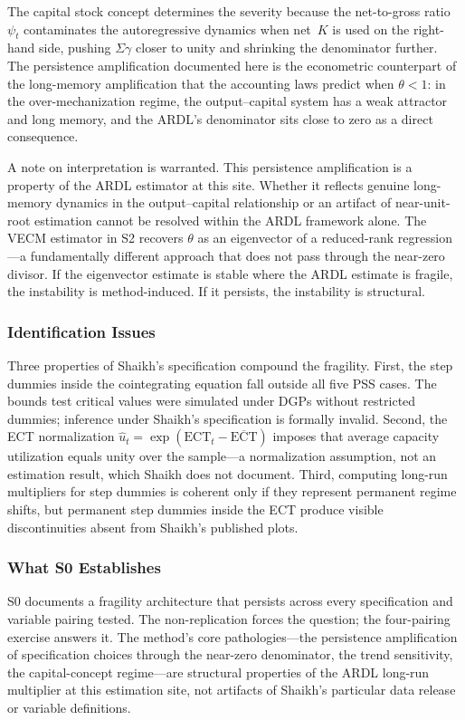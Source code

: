 \documentclass[11pt,a4paper]{article}
\begin{document}
The capital stock concept determines the severity because the net-to-gross ratio $\psi_t$ contaminates the autoregressive dynamics when net~$K$ is used on the right-hand side, pushing $\Sigma\gamma$ closer to unity and shrinking the denominator further. The persistence amplification documented here is the econometric counterpart of the long-memory amplification that the accounting laws predict when $\theta < 1$: in the over-mechanization regime, the output--capital system has a weak attractor and long memory, and the ARDL's denominator sits close to zero as a direct consequence.

A note on interpretation is warranted. This persistence amplification is a property of the ARDL estimator at this site. Whether it reflects genuine long-memory dynamics in the output--capital relationship or an artifact of near-unit-root estimation cannot be resolved within the ARDL framework alone. The VECM estimator in S2 recovers $\theta$ as an eigenvector of a reduced-rank regression---a fundamentally different approach that does not pass through the near-zero divisor. If the eigenvector estimate is stable where the ARDL estimate is fragile, the instability is method-induced. If it persists, the instability is structural.


\subsubsection{Identification Issues}

Three properties of Shaikh's specification compound the fragility. First, the step dummies inside the cointegrating equation fall outside all five PSS cases. The bounds test critical values were simulated under DGPs without restricted dummies; inference under Shaikh's specification is formally invalid. Second, the ECT normalization $\hat{u}_t = \exp(\text{ECT}_t - \overline{\text{ECT}})$ imposes that average capacity utilization equals unity over the sample---a normalization assumption, not an estimation result, which Shaikh does not document. Third, computing long-run multipliers for step dummies is coherent only if they represent permanent regime shifts, but permanent step dummies inside the ECT produce visible discontinuities absent from Shaikh's published plots.


\subsubsection{What S0 Establishes}

S0 documents a fragility architecture that persists across every specification and variable pairing tested. The non-replication forces the question; the four-pairing exercise answers it. The method's core pathologies---the persistence amplification of specification choices through the near-zero denominator, the trend sensitivity, the capital-concept regime---are structural properties of the ARDL long-run multiplier at this estimation site, not artifacts of Shaikh's particular data release or variable definitions.
\end{document}
